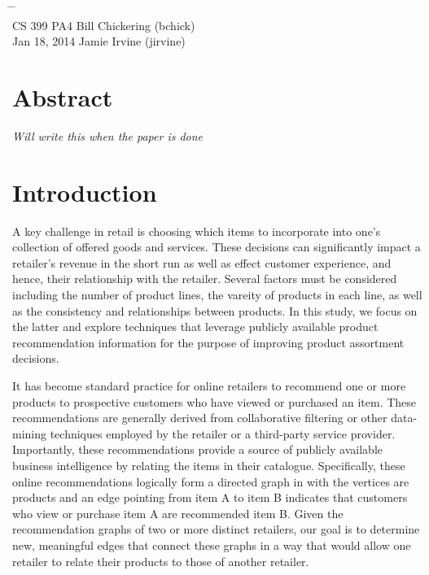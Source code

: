 \documentclass[10pt]{article}
\begin{document}

{\LARGE\bf
\begin{tabbing}
\hspace{2.8in} \= \hspace{1.3in} \= \hspace{1.2in} \= \\

CS 399 \> PA4 \> Bill Chickering (bchick)\\
\normalsize Jan 18, 2014 \> \> Jamie Irvine (jirvine)
\end{tabbing}
} \vspace{.4in}

\section*{Abstract}
\emph{Will write this when the paper is done}

\section*{Introduction}
A key challenge in retail is choosing which items to incorporate into one's
collection of offered goods and services. These decisions can significantly
impact a retailer's revenue in the short run as well as effect customer
experience, and hence, their relationship with the retailer. Several factors
must be considered including the number of product lines, the vareity of
products in each line, as well as the consistency and relationships between
products. In this study, we focus on the latter and explore techniques that
leverage publicly available product recommendation information for the purpose
of improving product assortment decisions.

It has become standard practice for online retailers to recommend one or more
products to prospective customers who have viewed or purchased an item. These
recommendations are generally derived from collaborative filtering or other
data-mining techniques employed by the retailer or a third-party service
provider. Importantly, these recommendations provide a source of publicly
available business intelligence by relating the items in their catalogue.
Specifically, these online recommendations logically form a directed graph in
with the vertices are products and an edge pointing from item A to item B
indicates that customers who view or purchase item A are recommended item B.
Given the recommendation graphs of two or more distinct retailers, our goal is
to determine new, meaningful edges that connect these graphs in a way that would
allow one retailer to relate their products to those of another retailer.
\end{document}
